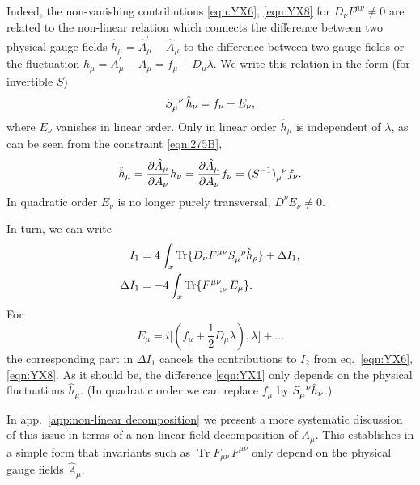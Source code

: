\documentclass[twocolumn,aps,prd,amsmath,amssymb,preprintnumbers,longbibliography]{revtex4-1}
\numberwithin{equation}{section}
\DeclareMathOperator{\Tr}{Tr}
\newenvironment{alignedeqn}{\begin{equation}\begin{aligned}}{\end{aligned}\end{equation}\ignorespacesafterend}
\begin{document}
Indeed, the non-vanishing contributions \eqref{eqn:YX6}, \eqref{eqn:YX8} for $D_\nu F^{\mu\nu}\neq 0$ are related to the non-linear relation which connects the difference between two physical gauge fields $\hat{h}_\mu = \hat{A}_\mu^\prime - \hat{A}_\mu$ to the difference between two gauge fields or the fluctuation $h_\mu = A_\mu^\prime - A_\mu = f_\mu + D_\mu\lambda$. We write this relation in the form (for invertible $S$)
\begin{equation}\label{eqn:228Aa}
	\tensor{S}{_\mu^\nu} \, \hat{h}_\nu
	= f_\nu + E_\nu,
\end{equation}
where $E_\nu$ vanishes in linear order. Only in linear order $\hat{h}_\mu$ is independent of $\lambda$, as can be seen from the constraint \eqref{eqn:275B},
\begin{equation}\label{eqn:288B}
	\hat{h}_\mu
	= \frac{\partial \hat{A}_\mu}{\partial A_\nu} h_\nu
	= \frac{\partial \hat{A}_\mu}{\partial A_\nu} f_\nu
	= \tensor{(S^{-1})}{_\mu^\nu} f_\nu.
\end{equation}
In quadratic order $E_\nu$ is no longer purely transversal, $D^\nu E_\nu\neq 0$.

In turn, we can write
\begin{alignedeqn}\label{eqn:288C}
	I_1
	&= 4 \int_x \Tr\{D_\nu F^{\mu\nu} \tensor{S}{_\mu^\rho} \hat{h}_\rho \} + \Delta I_1,\\
	\Delta I_1
	&= -4 \int_x \Tr\{\tensor{F}{^\mu^\nu_;_\nu} E_\mu\}.
\end{alignedeqn}
For
\begin{equation}\label{eqn:288D}
	E_\mu
	= i \bigl[(f_\mu + \frac{1}{2} D_\mu\lambda),\lambda\bigr] + \dots
\end{equation}
the corresponding part in $\Delta I_1$ cancels the contributions to $I_2$ from eq.~\eqref{eqn:YX6}, \eqref{eqn:YX8}. As it should be, the difference \eqref{eqn:YX1} only depends on the physical fluctuations $\hat{h}_\mu$. (In quadratic order we can replace $f_\mu$ by $\tensor{S}{_\mu^\nu} \hat{h}_\nu$.)

In app.~\ref{app:non-linear decomposition} we present a more systematic discussion of this issue in terms of a non-linear field decomposition of $A_\mu$. This establishes in a simple form that invariants such as $\Tr F_{\mu\nu} \, F^{\mu\nu}$ only depend on the physical gauge fields $\hat{A}_\mu$.
\end{document}
